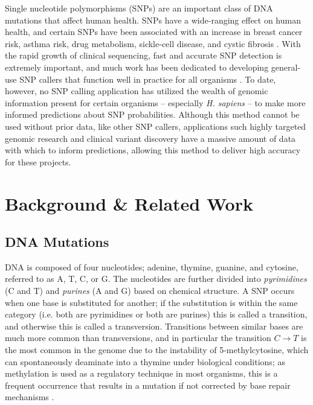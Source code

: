 \documentclass[10pt,letterpaper]{article}
\begin{document}
\par Single nucleotide polymorphisms (SNPs) are an important class of DNA mutations that affect human health. SNPs have a wide-ranging effect
on human health, and certain SNPs have been associated with an increase in breast cancer risk, asthma risk, drug metabolism, sickle-cell disease, and cystic fibrosis \cite{1}.
With the rapid growth of clinical sequencing, fast and accurate SNP detection is extremely important, and much work has been dedicated to developing general-use
SNP callers that function well in practice for all organisms \cite{2}. To date, however, no SNP calling application has utilized the wealth of genomic information
present for certain organisms -- especially \textit{H. sapiens} -- to make more informed predictions about SNP probabilities. Although this method cannot be used without prior data,
like other SNP callers, applications such highly targeted genomic research and clinical variant discovery have a massive amount of data with which to inform predictions,
allowing this method to deliver high accuracy for these projects.

\section{Background \& Related Work}

\subsection{DNA Mutations}

\par DNA is composed of four nucleotides; adenine, thymine, guanine, and cytosine, referred to as A, T, C, or G. The nucleotides are further divided into \textit{pyrimidines} (C and T) and
\textit{purines} (A and G) based on chemical structure. A SNP occurs when one base is substituted for another; if the substitution is within the same category (i.e. both are pyrimidines
or both are purines) this is called a transition, and otherwise this is called a transversion. Transitions between similar bases are much more common than transversions, and in particular
the transition $C \rightarrow T$ is the most common in the genome due to the instability of 5-methylcytosine, which can spontaneously deaminate into a thymine under biological conditions;
as methylation is used as a regulatory technique in most organisms, this is a frequent occurrence that results in a mutation if not corrected by base repair mechanisms \cite{3}.
\end{document}
